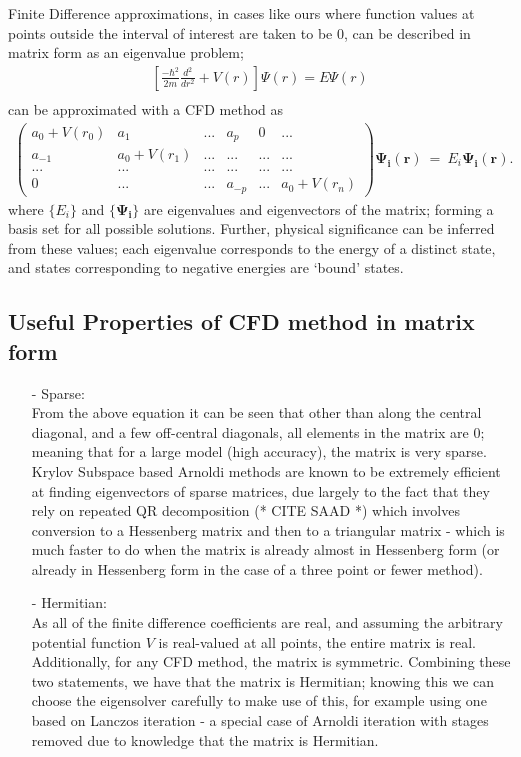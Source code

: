 Finite Difference approximations, in cases like ours where function values at points outside the interval of interest are taken to be $0$, can be described in matrix form as an eigenvalue problem; 
\begin{align*}
    \left[\frac{-\hbar^{2}}{2m}\frac{d^2}{dr^2} + V\left(r\right)\right] \Psi\left(r\right) = E\Psi\left(r\right)\\
\end{align*}
can be approximated with a CFD method as
\begin{align*}
    \begin{pmatrix}
        a_{0}+V\left(r_{0}\right)&a_{1}&...&a_{p}&0&...\\
        a_{-1}&a_{0}+V\left(r_{1}\right)&...&...&...&...\\
        ...&...&...&...&...&...\\
        0&...&...&a_{-p}&...&a_{0}+V\left(r_{n}\right)
    \end{pmatrix}\mathbf{\Psi_{i}\left(r\right)}\ =\ E_{i}\mathbf{\Psi_{i}\left(r\right)}.
\end{align*}
where $\{E_{i}\}$ and $\{\mathbf{\Psi_{i}}\}$ are eigenvalues and eigenvectors of the matrix; forming a basis set for all possible solutions. Further, physical significance can be inferred from these values; each eigenvalue corresponds to the energy of a distinct state, and states corresponding to negative energies are `bound' states.

\subsection{Useful Properties of CFD method in matrix form}
\begin{itemize}
\item[-]Sparse: \\ From the above equation it can be seen that other than along the central diagonal, and a few off-central diagonals, all elements in the matrix are $0$; meaning that for a large model (high accuracy), the matrix is very sparse. Krylov Subspace based Arnoldi methods are known to be extremely efficient at finding eigenvectors of sparse matrices, due largely to the fact that they rely on repeated QR decomposition (* CITE SAAD *) which involves conversion to a Hessenberg matrix and then to a triangular matrix - which is much faster to do when the matrix is already almost in Hessenberg form (or already in Hessenberg form in the case of a three point or fewer method).
\item[-]Hermitian: \\ As all of the finite difference coefficients are real, and assuming the arbitrary potential function $V$ is real-valued at all points, the entire matrix is real. Additionally, for any CFD method, the matrix is symmetric. Combining these two statements, we have that the matrix is Hermitian; knowing this we can choose the eigensolver carefully to make use of this, for example using one based on Lanczos iteration - a special case of Arnoldi iteration with stages removed due to knowledge that the matrix is Hermitian.
\end{itemize}

